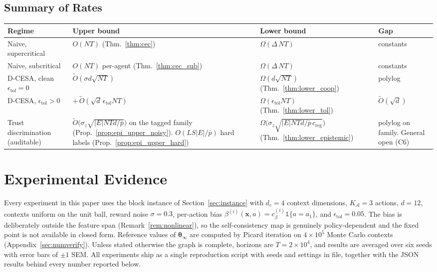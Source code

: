\documentclass[11pt]{article}
\newcommand{\Ot}{\widetilde{O}}
\begin{document}
\subsection{Summary of Rates}

\begin{center}
\begin{tabular}{@{}llll@{}}
\toprule
Regime & Upper bound & Lower bound & Gap \\
\midrule
Naive, supercritical & $O(NT)$ (Thm.~\ref{thm:cec}) & $\Omega(\Delta\,NT)$ & constants \\
Naive, subcritical & $O(NT)$ per-agent (Thm.~\ref{thm:cec_sub}) & $\Omega(\Delta\,NT)$ & constants \\
D-CESA, clean $\epsilon_{\mathrm{tol}}=0$ & $\Ot(\sigma d\sqrt{NT})$ & $\Omega(d\sqrt{NT})$ (Thm.~\ref{thm:lower_coop}) & polylog \\
D-CESA, $\epsilon_{\mathrm{tol}}>0$ & $+\,\Ot(\sqrt d\,\epsilon_{\mathrm{tol}}NT)$ & $\Omega(\epsilon_{\mathrm{tol}}NT)$ (Thm.~\ref{thm:lower_tol}) & $\Ot(\sqrt d)$ \\
Trust discrimination (auditable) & $\Ot\bigl(\sigma_z\sqrt{|E|NTd/\bar p}\bigr)$ on the tagged family (Prop.~\ref{prop:epi_upper_noisy}). $O(LS|E|/\bar p)$ hard labels (Prop.~\ref{prop:epi_upper_hard}) & $\Omega\bigl(\sigma_z\sqrt{|E|NTd/\bar p\,c_{\mathrm{reg}}}\bigr)$ (Thm.~\ref{thm:lower_epistemic}) & polylog on family. General open (C6) \\
\bottomrule
\end{tabular}
\end{center}

\section{Experimental Evidence}\label{sec:experiments}

Every experiment in this paper uses the block instance of
Section~\ref{sec:instance} with $d_c=4$ context dimensions,
$K_{\mathcal A}=3$ actions, $d=12$, contexts uniform on the unit ball,
reward noise $\sigma=0.3$, per-action bias
$\beta^{(i)}(\bm x,a)=c_\beta^{(i)}\mathbb 1\{a=a_1\}$, and
$\epsilon_{\mathrm{tol}}=0.05$.  The bias is deliberately outside the
feature span (Remark~\ref{rem:nonlinear}), so the self-consistency map
is genuinely policy-dependent and the fixed point is not available in
closed form. Reference values of $\bm\theta_\infty$ are computed by
Picard iteration on $4\times10^5$ Monte Carlo contexts
(Appendix~\ref{sec:numverify}).  Unless stated otherwise the graph is
complete, horizons are $T=2\times10^4$, and results are averaged over
six seeds with error bars of $\pm1$ SEM. All experiments ship as a
single reproduction script with seeds and settings in file, together
with the JSON results behind every number reported below.
\end{document}

